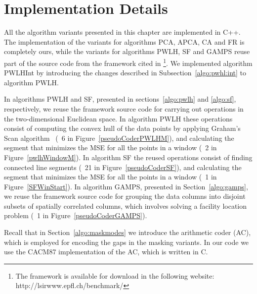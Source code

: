 


\vspace{+10pt}
\section{Implementation Details}
\label{algo:adddetails}


All the algorithm variants presented in this chapter are implemented in C++. The implementation of the variants for algorithms PCA, APCA, CA and FR is completely ours, while the variants for algorithms PWLH, SF and GAMPS reuse part of the source code from the framework cited in \cite{AnEva2013}\footnote{The framework is available for download in the following website: http://lsirwww.epfl.ch/benchmark/}. We implemented algorithm PWLHInt by introducing the changes described in Subsection~\ref{algo:pwhl:int} to algorithm PWLH. 


In algorithms PWLH and SF, presented in sections~\ref{algo:pwlh} and \ref{algo:sf}, respectively, we reuse the framework source code for carrying out operations in the two-dimensional Euclidean space. In algorithm PWLH these operations consist of computing the convex hull of the data points by applying Graham's Scan algorithm~\cite{GrahamAlgo} (\Line~6 in Figure~\ref{pseudoCoderPWLHM}), and calculating the segment that minimizes the MSE for all the points in a window (\Line~2 in Figure~\ref{pwlhWindowM}). In algorithm SF the reused operations consist of finding connected line segments (\Line~21 in Figure~\ref{pseudoCoderSF}), and calculating the segment that minimizes the MSE for all the points in a window (\Line~1 in Figure~\ref{SFWinStart}). In algorithm GAMPS, presented in Section~\ref{algo:gamps}, we reuse the framework source code for grouping the data columns into disjoint subsets of spatially correlated columns, which involves solving a facility location problem (\Line~1 in Figure~\ref{pseudoCoderGAMPS}).


Recall that in Section~\ref{algo:maskmodes} we introduce the arithmetic coder (AC), which is employed for encoding the gaps in the masking variants. In our code we use the CACM87 implementation \cite{arcodingcomp, ac1} of the AC, which is written in C.

